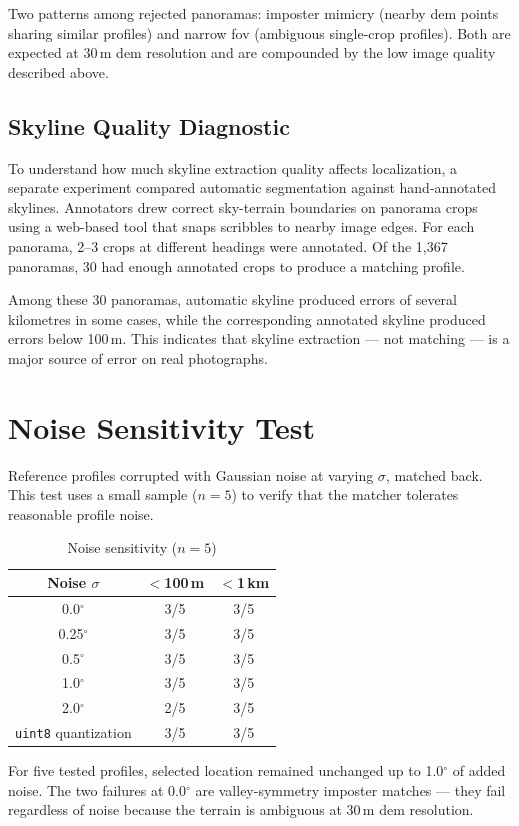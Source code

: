 Two patterns among rejected panoramas: imposter mimicry (nearby \Gls{dem} points sharing similar profiles) and narrow \Gls{fov} (ambiguous single-crop profiles). Both are expected at 30\,m \Gls{dem} resolution and are compounded by the low image quality described above.

\subsection{Skyline Quality Diagnostic}

To understand how much skyline extraction quality affects localization, a separate experiment compared automatic segmentation against hand-annotated skylines. Annotators drew correct sky-terrain boundaries on panorama crops using a web-based tool that snaps scribbles to nearby image edges. For each panorama, 2--3 crops at different headings were annotated. Of the 1,367 panoramas, 30 had enough annotated crops to produce a matching profile.

Among these 30 panoramas, automatic skyline produced errors of several kilometres in some cases, while the corresponding annotated skyline produced errors below 100\,m. This indicates that skyline extraction --- not matching --- is a major source of error on real photographs.

\section{Noise Sensitivity Test}

Reference profiles corrupted with Gaussian noise at varying $\sigma$, matched back. This test uses a small sample ($n = 5$) to verify that the matcher tolerates reasonable profile noise.

\begin{table}[H]
\centering
\caption{Noise sensitivity ($n = 5$)}
\label{tab:noise_sensitivity}
\begin{tabular}{ccc}
\toprule
\textbf{Noise $\sigma$} & \textbf{$<$100\,m} & \textbf{$<$1\,km} \\
\midrule
0.0$^\circ$ & 3/5 & 3/5 \\
0.25$^\circ$ & 3/5 & 3/5 \\
0.5$^\circ$ & 3/5 & 3/5 \\
1.0$^\circ$ & 3/5 & 3/5 \\
2.0$^\circ$ & 2/5 & 3/5 \\
\texttt{uint8} quantization & 3/5 & 3/5 \\
\bottomrule
\end{tabular}
\end{table}

For five tested profiles, selected location remained unchanged up to 1.0$^\circ$ of added noise. The two failures at 0.0$^\circ$ are valley-symmetry imposter matches --- they fail regardless of noise because the terrain is ambiguous at 30\,m \Gls{dem} resolution.
